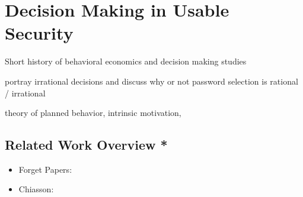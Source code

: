 
\chapter[Decision Making in Usable Security]{Decision Making in Usable Security}\label{chap:rw:persuasion}

Short history of behavioral economics and decision making studies

portray irrational decisions and discuss why or not password selection is rational / irrational

theory of planned behavior, intrinsic motivation, 


\section*{Related Work Overview *}
\begin{itemize}
\item Forget Papers: \cite{Forget2007PersuasionEducationSecurity} \cite{Forget2007HelpingUsers} \cite{Forget2008ImprovingPasswordsThroughPersuasion} \cite{Forget2008MemorabilityPersuasivePasswords} \cite{Forget2008PersuasionStrongerPasswords}

\item Chiasson: \cite{Chiasson2008PCCP}
\end{itemize}


\cite{Furnell2017GuidanceCompliance,Kaptein2015PersonalizingPersuasiveTechnologies,Gulenko2014PasswordsEmotion,Azevedo2012AuthenticationGame,Kroeze2012GamifyingAuthentication,Schneider2016UnderstandingPersuasiveDesign,Cialdini2003CraftingNormativeMessages,Scott1995GDMS,Kim2015MobilePersuasionTrust,Bellur2014HeuristicsUsed,Baharin2015RhythmicPersuasionModel,Adams2015MindlessComputing,Han1994PersuasionCulture,Balebako2011,Acquisti2009,Forget2007PersuasionEducationSecurity,Forget2008ImprovingPasswordsThroughPersuasion,Xu2007,Zakaria2013DesigningEffectiveSecurityMessages,Egelman2010PleaseContinueToHold,Yevseyeva2014,DiGioia2005SocialNavigationUsableSecurity,Chiasson2008PCCP,Wiafe2012,Weirich2005PersuasivePasswordSecurity,Forget2008MemorabilityPersuasivePasswords,Jeske2013,Wang2014,Weirich2001PrettyGoodPersuasion,Adjerid,Shiv2005,Wiafe2012a,Almuhimedi2015a,Radke2013,Arachchilage2013GameDesingPhishing,Ashenden2013SecurityLikeSoap,Bahr2013,Korff2014TooMuchChoice,Muscanell2014,Woodruff2014PrivacyFundamentalist,Korff2014,Goldstein2008,Forget2008PersuasionStrongerPasswords,Wang2013,Hamari2014,Jameson2011PreferentialChoice,Instructor2013,Mamduhi2012,Lockton2012CognitiveBiases,Choe,Fogg2002Persuasive,Fogg2009,Lockton2010,Hekler2013,Lockton2009,Lee2011MiningBehavioralEconomics}


